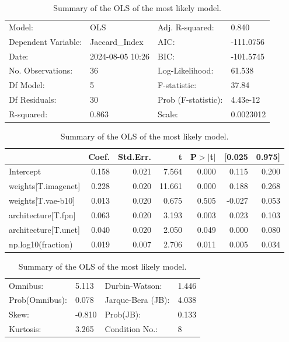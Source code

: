 \begin{table}
\caption{Summary of the OLS of the most likely model.}
\label{tab:data_fraction_parameter_influence_full}
\begin{center}
\begin{tabular}{llll}
\hline
Model:              & OLS              & Adj. R-squared:     & 0.840      \\
Dependent Variable: & Jaccard\_Index   & AIC:                & -111.0756  \\
Date:               & 2024-08-05 10:26 & BIC:                & -101.5745  \\
No. Observations:   & 36               & Log-Likelihood:     & 61.538     \\
Df Model:           & 5                & F-statistic:        & 37.84      \\
Df Residuals:       & 30               & Prob (F-statistic): & 4.43e-12   \\
R-squared:          & 0.863            & Scale:              & 0.0023012  \\
\hline
\end{tabular}
\end{center}

\begin{center}
\begin{tabular}{lrrrrrr}
\hline
                     & Coef. & Std.Err. &      t & P$> |$t$|$ & [0.025 & 0.975]  \\
\hline
Intercept            & 0.158 &    0.021 &  7.564 &       0.000 &  0.115 &  0.200  \\
weights[T.imagenet]  & 0.228 &    0.020 & 11.661 &       0.000 &  0.188 &  0.268  \\
weights[T.vae-b10]   & 0.013 &    0.020 &  0.675 &       0.505 & -0.027 &  0.053  \\
architecture[T.fpn]  & 0.063 &    0.020 &  3.193 &       0.003 &  0.023 &  0.103  \\
architecture[T.unet] & 0.040 &    0.020 &  2.050 &       0.049 &  0.000 &  0.080  \\
np.log10(fraction)   & 0.019 &    0.007 &  2.706 &       0.011 &  0.005 &  0.034  \\
\hline
\end{tabular}
\end{center}

\begin{center}
\begin{tabular}{llll}
\hline
Omnibus:       & 5.113  & Durbin-Watson:    & 1.446  \\
Prob(Omnibus): & 0.078  & Jarque-Bera (JB): & 4.038  \\
Skew:          & -0.810 & Prob(JB):         & 0.133  \\
Kurtosis:      & 3.265  & Condition No.:    & 8      \\
\hline
\end{tabular}
\end{center}
\end{table}
\bigskip
